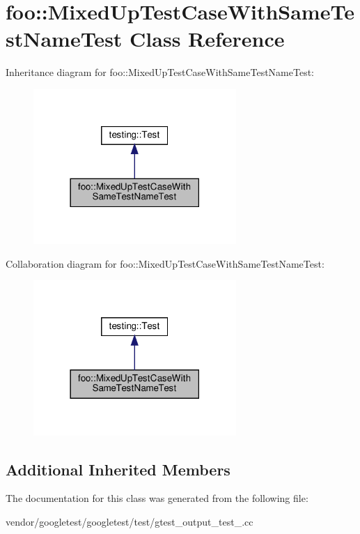 \hypertarget{classfoo_1_1_mixed_up_test_case_with_same_test_name_test}{}\section{foo\+:\+:Mixed\+Up\+Test\+Case\+With\+Same\+Test\+Name\+Test Class Reference}
\label{classfoo_1_1_mixed_up_test_case_with_same_test_name_test}


Inheritance diagram for foo\+:\+:Mixed\+Up\+Test\+Case\+With\+Same\+Test\+Name\+Test\+:
\nopagebreak
\begin{figure}[H]
\begin{center}
\leavevmode
\includegraphics[width=218pt]{classfoo_1_1_mixed_up_test_case_with_same_test_name_test__inherit__graph}
\end{center}
\end{figure}


Collaboration diagram for foo\+:\+:Mixed\+Up\+Test\+Case\+With\+Same\+Test\+Name\+Test\+:
\nopagebreak
\begin{figure}[H]
\begin{center}
\leavevmode
\includegraphics[width=218pt]{classfoo_1_1_mixed_up_test_case_with_same_test_name_test__coll__graph}
\end{center}
\end{figure}
\subsection*{Additional Inherited Members}


The documentation for this class was generated from the following file\+:\begin{DoxyCompactItemize}
\item 
vendor/googletest/googletest/test/gtest\+\_\+output\+\_\+test\+\_\+.\+cc\end{DoxyCompactItemize}
